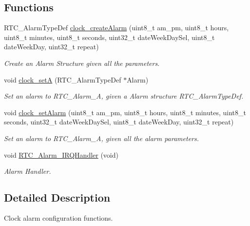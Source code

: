 \subsection*{Functions}
\begin{DoxyCompactItemize}
\item 
R\+T\+C\+\_\+\+Alarm\+Type\+Def \hyperlink{group___clock___alarms_ga5e1614dbb1a210106dbade3f133db27e}{clock\+\_\+create\+Alarm} (uint8\+\_\+t am\+\_\+pm, uint8\+\_\+t hours, uint8\+\_\+t minutes, uint8\+\_\+t seconds, uint32\+\_\+t date\+Week\+Day\+Sel, uint8\+\_\+t date\+Week\+Day, uint32\+\_\+t repeat)
\begin{DoxyCompactList}\small\item\em Create an Alarm Structure given all the parameters. \end{DoxyCompactList}\item 
void \hyperlink{group___clock___alarms_gab56f512746d4f2638232db28bb7dac2b}{clock\+\_\+setA} (R\+T\+C\+\_\+\+Alarm\+Type\+Def $\ast$Alarm)
\begin{DoxyCompactList}\small\item\em Set an alarm to R\+T\+C\+\_\+\+Alarm\+\_\+A, given a Alarm structure R\+T\+C\+\_\+\+Alarm\+Type\+Def. \end{DoxyCompactList}\item 
void \hyperlink{group___clock___alarms_gaea1a099c4ad6de8b99517ac6453e3569}{clock\+\_\+set\+Alarm} (uint8\+\_\+t am\+\_\+pm, uint8\+\_\+t hours, uint8\+\_\+t minutes, uint8\+\_\+t seconds, uint32\+\_\+t date\+Week\+Day\+Sel, uint8\+\_\+t date\+Week\+Day, uint32\+\_\+t repeat)
\begin{DoxyCompactList}\small\item\em Set an alarm to R\+T\+C\+\_\+\+Alarm\+\_\+A, given all the alarm parameters. \end{DoxyCompactList}\item 
void \hyperlink{group___clock___alarms_ga4da4fb52ec579671d337938e78f9a207}{R\+T\+C\+\_\+\+Alarm\+\_\+\+I\+R\+Q\+Handler} (void)
\begin{DoxyCompactList}\small\item\em Alarm Handler. \end{DoxyCompactList}\end{DoxyCompactItemize}


\subsection{Detailed Description}
Clock alarm configuration functions. 




